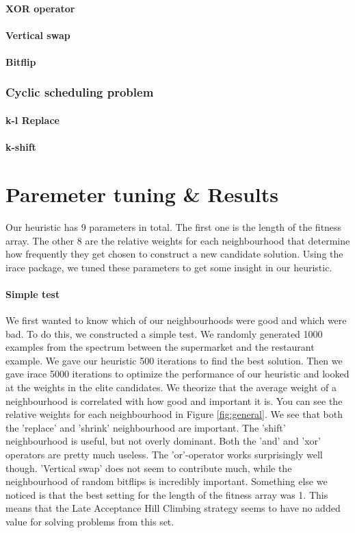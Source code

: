 \documentclass[]{article}
\begin{document}
\paragraph{XOR operator}
\paragraph{Vertical swap}
\paragraph{Bitflip}
\subsubsection{Cyclic scheduling problem}
\paragraph{k-l Replace}
\paragraph{k-shift}

\section{Paremeter tuning \& Results}
Our heuristic has 9 parameters in total. The first one is the length of the fitness array. The other 8 are the relative weights for each neighbourhood that determine how frequently they get chosen to construct a new candidate solution. Using the irace package, we tuned these parameters to get some insight in our heuristic.

\paragraph{Simple test}
We first wanted to know which of our neighbourhoods were good and which were bad. To do this, we constructed a simple test. We randomly generated 1000 examples from the spectrum between the supermarket and the restaurant example. We gave our heuristic 500 iterations to find the best solution. Then we gave irace 5000 iterations to optimize the performance of our heuristic and looked at the weights in the elite candidates. We theorize that the average weight of a neighbourhood is correlated with how good and important it is. You can see the relative weights for each neighbourhood in Figure \ref{fig:general}. We see that both the 'replace' and 'shrink' neighbourhood are important. The 'shift' neighbourhood is useful, but not overly dominant. Both the 'and' and 'xor' operators are pretty much useless. The 'or'-operator works surprisingly well though. 'Vertical swap' does not seem to contribute much, while the neighbourhood of random bitflips is incredibly important. Something else we noticed is that the best setting for the length of the fitness array was 1. This means that the Late Acceptance Hill Climbing strategy seems to have no added value for solving problems from this set.
\end{document}
